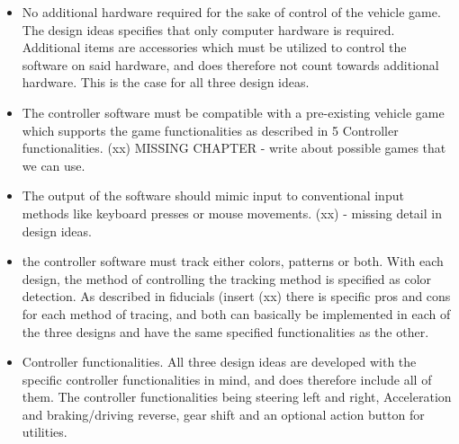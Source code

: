 \begin{itemize}
\item No additional hardware required for the sake of control of the vehicle game.\newline
The design ideas specifies that only computer hardware is required. Additional items are accessories which must be utilized to control the software on said hardware, and does therefore not count towards additional hardware. This is the case for all three design ideas.

\item The controller software must be compatible with a pre-existing vehicle game which supports
the game functionalities as described in 5 Controller functionalities.\newline
(xx) MISSING CHAPTER - write about possible games that we can use.

\item The output of the software should mimic input to conventional input methods like keyboard
presses or mouse movements.\newline
(xx) - missing detail in design ideas.

\item the controller software must track either colors, patterns or both.\newline
With each design, the method of controlling the tracking method is specified as color detection. As described in fiducials (insert (xx) there is specific pros and cons for each method of tracing, and both can basically be implemented in each of the three designs and have the same specified functionalities as the other.

\item Controller functionalities.\newline
All three design ideas are developed with the specific controller functionalities in mind, and does therefore include all of them. The controller functionalities being steering left and right, Acceleration and braking/driving reverse, gear shift and an optional action button for utilities.

\end{itemize}